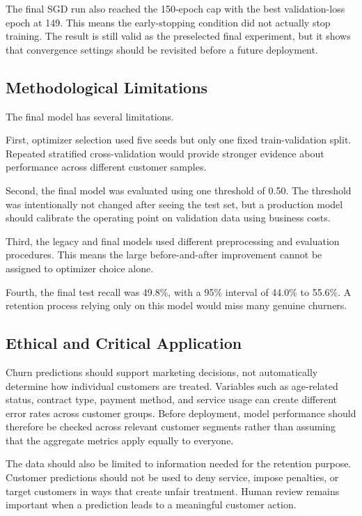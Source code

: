 \documentclass[11pt]{article}
\begin{document}
The final SGD run also reached the 150-epoch cap with the best validation-loss epoch at 149. This means the early-stopping condition did not actually stop training. The result is still valid as the preselected final experiment, but it shows that convergence settings should be revisited before a future deployment.

\subsection{Methodological Limitations}

The final model has several limitations.

First, optimizer selection used five seeds but only one fixed train-validation split. Repeated stratified cross-validation would provide stronger evidence about performance across different customer samples.

Second, the final model was evaluated using one threshold of 0.50. The threshold was intentionally not changed after seeing the test set, but a production model should calibrate the operating point on validation data using business costs.

Third, the legacy and final models used different preprocessing and evaluation procedures. This means the large before-and-after improvement cannot be assigned to optimizer choice alone.

Fourth, the final test recall was 49.8\%, with a 95\% interval of 44.0\% to 55.6\%. A retention process relying only on this model would miss many genuine churners.

\subsection{Ethical and Critical Application}

Churn predictions should support marketing decisions, not automatically determine how individual customers are treated. Variables such as age-related status, contract type, payment method, and service usage can create different error rates across customer groups. Before deployment, model performance should therefore be checked across relevant customer segments rather than assuming that the aggregate metrics apply equally to everyone.

The data should also be limited to information needed for the retention purpose. Customer predictions should not be used to deny service, impose penalties, or target customers in ways that create unfair treatment. Human review remains important when a prediction leads to a meaningful customer action.
\end{document}
